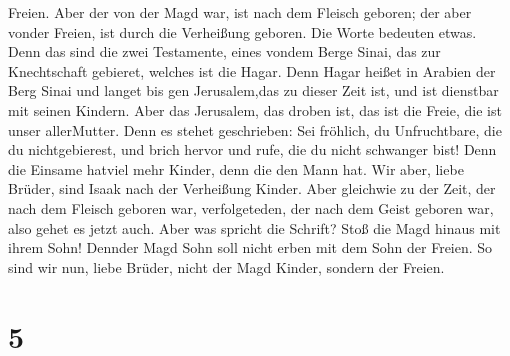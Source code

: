 Freien.  Aber der von der Magd war, ist nach dem Fleisch
geboren; der aber vonder Freien, ist durch die Verheißung geboren.
 Die Worte bedeuten etwas. Denn das sind die zwei
Testamente, eines vondem Berge Sinai, das zur Knechtschaft gebieret,
welches ist die Hagar.  Denn Hagar heißet in Arabien der
Berg Sinai und langet bis gen Jerusalem,das zu dieser Zeit ist, und ist
dienstbar mit seinen Kindern.  Aber das Jerusalem, das
droben ist, das ist die Freie, die ist unser allerMutter. 
Denn es stehet geschrieben: Sei fröhlich, du Unfruchtbare, die du
nichtgebierest, und brich hervor und rufe, die du nicht schwanger bist!
Denn die Einsame hatviel mehr Kinder, denn die den Mann hat.
 Wir aber, liebe Brüder, sind Isaak nach der Verheißung
Kinder.  Aber gleichwie zu der Zeit, der nach dem Fleisch
geboren war, verfolgeteden, der nach dem Geist geboren war, also gehet
es jetzt auch.  Aber was spricht die Schrift? Stoß die Magd
hinaus mit ihrem Sohn! Dennder Magd Sohn soll nicht erben mit dem Sohn
der Freien.  So sind wir nun, liebe Brüder, nicht der Magd
Kinder, sondern der Freien.

\hypertarget{section-3}{%
\section{5}\label{section-3}}

